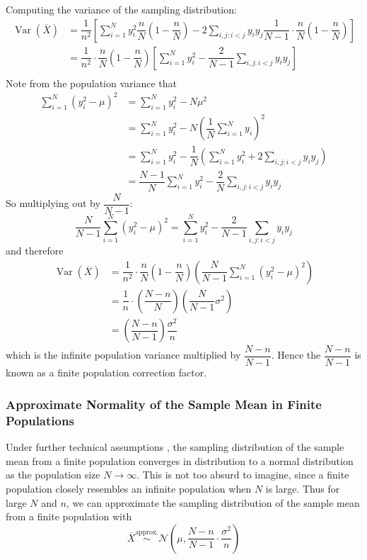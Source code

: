 \documentclass[11pt]{report} %
\begin{document}
Computing the variance of the sampling distribution:
\begin{align}
\operatorname{Var}\left(\overline{X}\right) &= \dfrac{1}{n^{2}}\left[\sum_{i=1}^{N}y_{i}^{2}\dfrac{n}{N}\left(1-\dfrac{n}{N}\right)-2\sum_{i,j:i<j}y_{i}y_{j}\dfrac{1}{N-1}\cdot\dfrac{n}{N}\left(1-\dfrac{n}{N}\right)\right] \\
&= \dfrac{1}{n^{2}}\cdot\dfrac{n}{N}\left(1-\dfrac{n}{N}\right)\left[\sum_{i=1}^{N}y_{i}^{2}-\dfrac{2}{N-1}\sum_{i,j:i<j}y_{i}y_{j}\right] \\
\end{align}
Note from the population variance that
\begin{align}
\sum_{i=1}^{N}\left(y_{i}^{2}-\mu\right)^{2} &= \sum_{i=1}^{N}y_{i}^{2}-N\mu^{2} \\
&= \sum_{i=1}^{N}y_{i}^{2}-N\left(\dfrac{1}{N}\sum_{i=1}^{N}y_{i}\right)^{2} \\
&= \sum_{i=1}^{N}y_{i}^{2}-\dfrac{1}{N}\left(\sum_{i=1}^{N}y_{i}^{2}+2\sum_{i,j:i<j}y_{i}y_{j}\right) \\
&= \dfrac{N-1}{N}\sum_{i=1}^{N}y_{i}^{2}-\dfrac{2}{N}\sum_{i,j:i<j}y_{i}y_{j}
\end{align}
So multiplying out by $\dfrac{N}{N - 1}$:
\begin{equation}
\dfrac{N}{N - 1}\sum_{i=1}^{N}\left(y_{i}^{2}-\mu\right)^{2} = \sum_{i=1}^{N}y_{i}^{2}-\dfrac{2}{N-1}\sum_{i,j:i<j}y_{i}y_{j}
\end{equation}
and therefore
\begin{align}
\operatorname{Var}\left(\overline{X}\right) &= \dfrac{1}{n^{2}}\cdot\dfrac{n}{N}\left(1-\dfrac{n}{N}\right)\left(\dfrac{N}{N - 1}\sum_{i=1}^{N}\left(y_{i}^{2}-\mu\right)^{2}\right) \\
&= \dfrac{1}{n}\cdot\left(\dfrac{N-n}{N}\right)\left(\dfrac{N}{N-1}\sigma^{2}\right) \\
&= \left(\dfrac{N-n}{N-1}\right)\dfrac{\sigma^{2}}{n}
\end{align}
which is the infinite population variance multiplied by $\dfrac{N-n}{N-1}$. Hence the $\dfrac{N-n}{N-1}$ is known as a finite population correction factor.

\subsubsection{Approximate Normality of the Sample Mean in Finite Populations}

Under further technical assumptions \cite{Wilks1962}, the sampling distribution of the sample mean from a finite population converges in distribution to a normal distribution as the population size $N \to \infty$. This is not too absurd to imagine, since a finite population closely resembles an infinite population when $N$ is large. Thus for large $N$ and $n$, we can approximate the sampling distribution of the sample mean from a finite population with
\begin{equation}
\overline{X} \overset{\mathrm{approx.}}{\sim} \mathcal{N}\left(\mu, \dfrac{N-n}{N-1}\cdot\dfrac{\sigma^{2}}{n}\right)
\end{equation}
\end{document}
